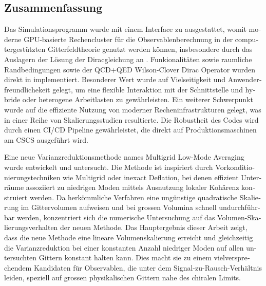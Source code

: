 \begin{otherlanguage}{ngerman}
\chapter*{Zusammenfassung}

Das Simulationsprogramm \openqxd wurde mit einem Interface zu \quda ausgestattet, womit moderne GPU-basierte Rechencluster für die Observablenberechnung in der computergestützten Gitterfeldtheorie genutzt werden können, insbesondere durch das Auslagern der Lösung der Diracgleichung an \quda.
Funkionalitäten sowie raumliche \Cstar Randbedingungen sowie der QCD+QED Wilson-Clover Dirac Operator wurden direkt in \quda implementiert.
Besonderer Wert wurde auf Vielseitigkeit und Anwenderfreundlichekeit gelegt, um eine flexible Interaktion mit der Schnittstelle und hybride oder heterogene Arbeitlasten zu gewährleisten.
Ein weiterer Schwerpunkt wurde auf die effiziente Nutzung von moderner Recheninfrastrukturen gelegt, was in einer Reihe von Skalierungsstudien resultierte.
Die Robustheit des Codes wird durch einen CI/CD Pipeline gewährleistet, die direkt auf Produktionsmaschinen am CSCS ausgeführt wird.

Eine neue Varianzreduktionsmethode names Multigrid Low-Mode Averaging wurde entwickelt und untersucht.
Die Methode ist inspiriert durch Vorkonditionierungstechniken wie Multigrid oder inexact Deflation, bei denen effizient Unterräume assoziiert zu niedrigen Moden mittels Ausnutzung lokaler Kohärenz konstruiert werden.
Da herkömmliche Verfahren eine ungünstige quadratische Skalierung im Gittervolumen aufweisen und bei grossen Volumina schnell undurchführbar werden, konzentriert sich die numerische Untersuchung auf das Volumen-Skalierungsverhalten der neuen Methode.
Das Hauptergebnis dieser Arbeit zeigt, dass die neue Methode eine lineare Volumenskalierung erreicht und gleichzeitig die Varianzreduktion bei einer konstanten Anzahl niedriger Moden auf allen untersuchten Gittern konstant halten kann.
Dies macht sie zu einem vielversprechendem Kandidaten für Observablen, die unter dem Signal-zu-Rausch-Verhältnis leiden, speziell auf grossen physikalischen Gittern nahe des chiralen Limits.

\end{otherlanguage}

\endgroup

\vfill
